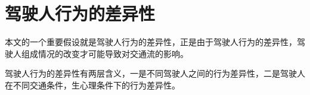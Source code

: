 %


%



\section{驾驶人行为的差异性}
本文的一个重要假设就是驾驶人行为的差异性，正是由于驾驶人行为的差异性，驾驶人组成情况的改变才可能导致对交通流的影响。

驾驶人行为的差异性有两层含义，一是不同驾驶人之间的行为差异性，二是驾驶人在不同交通条件，生心理条件下的行为差异性。


